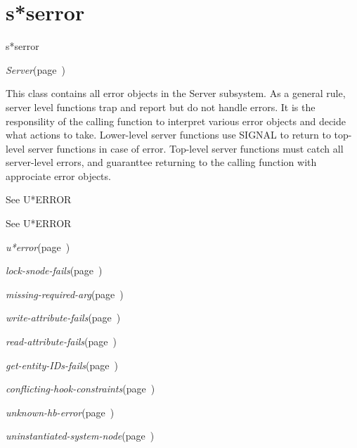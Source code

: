 \section{s*serror}
\label{s*serror}

\begin{description}
\item [Name:]  s*serror

\item [Layer:]
{\sl Server}\hfill(page~\pageref{Server}) 

\item [Description:]
This class contains all error objects in the Server subsystem.
As a general rule, server level functions trap and report but
do not handle errors. It is the responsility of the calling
function to interpret various error objects and decide what
actions to take. Lower-level server functions use SIGNAL to
return to top-level server functions in case of error.
Top-level server functions must catch all server-level errors,
and guaranttee returning to the calling function with
approciate error objects.

\item [Attributes:] See U*ERROR

\item [Operations:] See U*ERROR

\item [Collections:]

\item [Subclasses:]

\item [Superclasses:]
\item {\sl u*error}\hfill(page~\pageref{u*error})

\item [Instances:]
\item {\sl lock-snode-fails}\hfill(page~\pageref{lock-snode-fails})
\item {\sl missing-required-arg}\hfill(page~\pageref{missing-required-arg})
\item {\sl write-attribute-fails}\hfill(page~\pageref{write-attribute-fails})
\item {\sl read-attribute-fails}\hfill(page~\pageref{read-attribute-fails})
\item {\sl get-entity-IDs-fails}\hfill(page~\pageref{get-entity-IDs-fails})
\item {\sl conflicting-hook-constraints}\hfill(page~\pageref{conflicting-hook-constraints})
\item {\sl unknown-hb-error}\hfill(page~\pageref{unknown-hb-error})
\item {\sl uninstantiated-system-node}\hfill(page~\pageref{uninstantiated-system-node})


\end{description}
